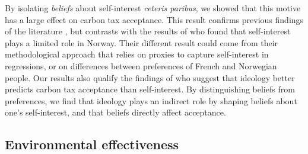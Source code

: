 \documentclass[11pt]{article}
\begin{document}


By isolating \textit{beliefs} about self-interest \textit{ceteris paribus}, we showed that this motive has a large effect on carbon tax acceptance. This result confirms previous findings of the literature  \citep{stern_value_1993,thalmann_public_2004,baranzini_effectiveness_2017}, but contrasts with the results of \citet{kallbekken_saelen_2011} who found that self-interest plays a limited role in Norway. Their different result could come from their methodological approach that relies on proxies to capture self-interest in regressions, or on differences between preferences of French and Norwegian people. Our results also qualify the findings of \citet{anderson_can_2019} who suggest that ideology better predicts carbon tax acceptance than self-interest. By distinguishing beliefs from preferences, we find that ideology plays an indirect role by shaping beliefs about one's self-interest, and that beliefs directly affect acceptance.


    \subsection{Environmental effectiveness}\label{subsec:motive_ee}
\end{document}
